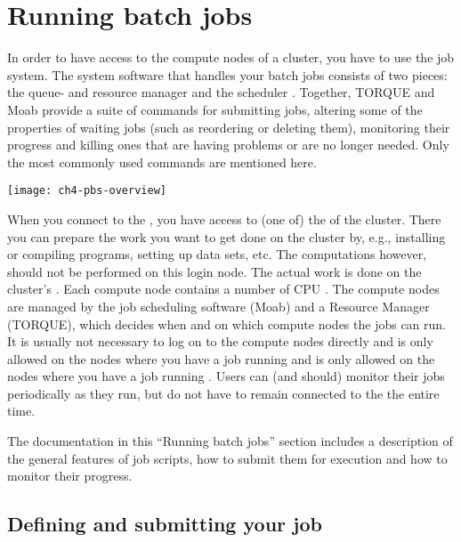 \chapter{Running batch jobs}
\label{ch:running-batch-jobs}

In order to have access to the compute nodes of a cluster, you have to use
the job system. The system software that handles your batch jobs consists of
two pieces: the queue- and resource manager  and the scheduler
. Together, TORQUE and Moab provide a suite of commands for
submitting jobs, altering some of the properties of waiting jobs (such as
reordering or deleting them), monitoring their progress and killing ones that
are having problems or are no longer needed. Only the most commonly used
commands are mentioned here.

\begin{center}
\texttt{[image: ch4-pbs-overview]}
\end{center}

When you connect to the \hpc, you have access to (one of) the  of the cluster. There you can prepare the work you want to get done on
the cluster by, e.g., installing or compiling programs, setting up data sets,
etc. The computations however, should not be performed on this login node. The
actual work is done on the cluster's . Each compute node
contains a number of CPU . The compute nodes are managed by the
job scheduling software (Moab) and a Resource Manager (TORQUE), which decides
when and on which compute nodes the jobs can run. It is usually not necessary
to log on to the
compute nodes directly
\ifbrussel
and is only allowed on the nodes where you have a job running
\fi
\ifgent
and is only allowed on the nodes where you have a job running
\fi
. Users can (and should) monitor their jobs
periodically as they run, but do not have to remain connected to the \hpc the entire
time.

The documentation in this ``Running batch jobs'' section includes a description
of the general features of job scripts, how to submit them for execution and
how to monitor their progress.

\section{Defining and submitting your job}

